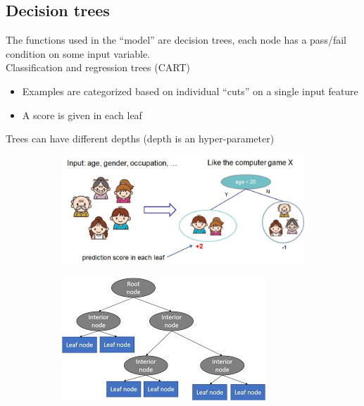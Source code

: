 \subsection{Decision trees}

The functions used in the “model” are decision trees, each node has a pass/fail condition on some input variable.\\
Classification and regression trees (CART)
\begin{itemize}
	\item Examples are categorized based on individual “cuts” on a single input feature
	\item A score is given in each leaf
\end{itemize}
Trees can have different depths (depth is an hyper-parameter)

\begin{figure}[ht]
	\centering
	\begin{subfigure}{.5\textwidth}
		\centering
		\includegraphics[width=1\linewidth]{figure_ml/decision_trees.png}
	\end{subfigure}%
	\begin{subfigure}{.5\textwidth}
		\centering
		\includegraphics[width=1\linewidth]{figure_ml/decision_trees2.png}
	\end{subfigure}
\end{figure}



